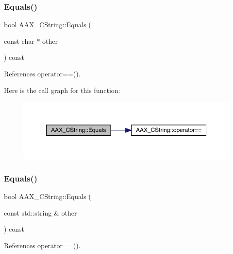 \subsubsection{\texorpdfstring{Equals()}{Equals()}\hspace{0.1cm}{\footnotesize\ttfamily [2/3]}}
{\footnotesize\ttfamily bool A\+A\+X\+\_\+\+C\+String\+::\+Equals (\begin{DoxyParamCaption}\item[{const char $\ast$}]{other }\end{DoxyParamCaption}) const\hspace{0.3cm}{\ttfamily [inline]}}



References operator==().

Here is the call graph for this function\+:
\nopagebreak
\begin{figure}[H]
\begin{center}
\leavevmode
\includegraphics[width=350pt]{a01573_ac076376f56af764540c48c015f0f541a_cgraph}
\end{center}
\end{figure}
\mbox{\label{a01573_af54d7f7faeab6cf63efb9239109d3390}} 
\subsubsection{\texorpdfstring{Equals()}{Equals()}\hspace{0.1cm}{\footnotesize\ttfamily [3/3]}}
{\footnotesize\ttfamily bool A\+A\+X\+\_\+\+C\+String\+::\+Equals (\begin{DoxyParamCaption}\item[{const std\+::string \&}]{other }\end{DoxyParamCaption}) const\hspace{0.3cm}{\ttfamily [inline]}}



References operator==().

